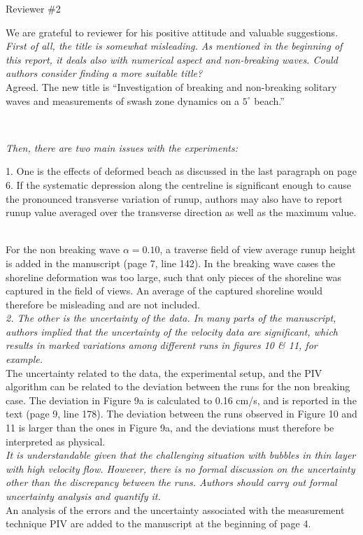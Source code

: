 \documentclass[11pt]{article}
\begin{document}
\newcommand{\refpoint}[1]{\ \vspace{0.3cm}\\ {\em #1}\  \vspace{0.3cm}\\ }
\newcommand{\todo}[1]{\ \\ {\bf To do: #1}}

Reviewer \#2

We are grateful to reviewer for his positive attitude and valuable suggestions.
\refpoint{First of all, the title is somewhat misleading. As mentioned in the beginning of this report, it deals also with 
numerical aspect and non-breaking waves. Could authors consider finding a more suitable title?}
Agreed.
The new title is ``Investigation of breaking and non-breaking solitary waves and measurements of swash zone dynamics on 
a $5^\circ$ beach.''

\refpoint{Then, there are two main issues with the experiments: 

1. One is the effects of deformed beach as discussed in the last paragraph on page 6. If the systematic depression along the centreline is significant enough to cause the pronounced transverse variation of runup, authors may also have to report runup value averaged over the transverse direction as well as the maximum value.}
For the non breaking wave $\alpha =0.10$, a traverse field of view average runup height is added in the manuscript (page 7, line 142). In the breaking wave cases the shoreline deformation was too large, such that only pieces of the shoreline was captured in the field of views. An average of the captured shoreline would therefore be misleading and are not included. 
\refpoint{2. The other is the uncertainty of the data. In many parts of the manuscript, authors implied that the uncertainty of the velocity data are significant, which results in marked variations among different runs in figures 10 \& 11, for example.}
The uncertainty related to the data, the experimental setup, and the PIV algorithm can be related to the deviation between the runs for the non breaking case. The deviation in Figure 9a is calculated to 0.16 cm/s, and is reported in the text (page 9, line 178). The deviation between the runs observed in Figure 10 and 11 is larger than the ones in Figure 9a, and the deviations must therefore be interpreted as physical.
\refpoint{ It is understandable given that the challenging situation with bubbles in thin layer with high velocity flow. However, there is no formal discussion on the uncertainty other than the discrepancy between the runs. Authors should carry out formal uncertainty analysis and quantify it.}
An analysis of the errors and the uncertainty associated with the measurement technique PIV are added to the manuscript at the beginning of page 4.
\end{document}

